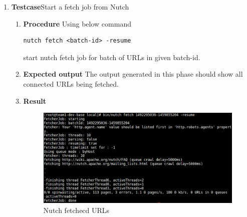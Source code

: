 \begin{enumerate}
\item \textbf{Testcase}\newline Start a fetch job from Nutch
  \begin{enumerate}[label={}]
  \item \textbf{Procedure}\newline
    Using below command 
    \begin{lstlisting}[style=Bash]
      nutch fetch <batch-id> -resume
    \end{lstlisting}
    start nutch fetch job for batch of URLs in given batch-id.
  \item \textbf{Expected output}\newline
    The output generated in this phase should show all connected URLs
    being fetched. 
  \item \textbf{Result}\newline
    \begin{figure}
      \centering
      \includegraphics[scale=0.4]{screenshots/nutch-fetch.png}
      \caption{Nutch fetchecd URLs}
      \label{nutch-fetch}
    \end{figure}
  \end{enumerate}



\end{enumerate}
